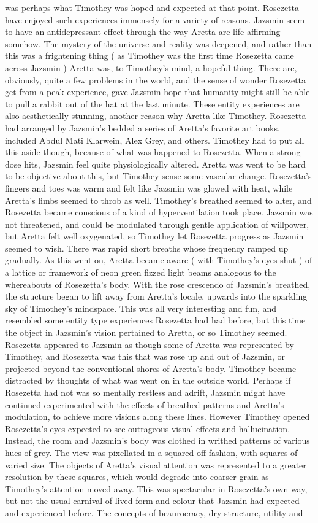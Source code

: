 \documentclass[12pt]{book}
\begin{document}
was perhaps what Timothey was hoped and expected at that point. Rosezetta have enjoyed such experiences immensely for a variety of reasons. Jazsmin seem to have an antidepressant effect through the way Aretta are life-affirming somehow. The mystery of the universe and reality was deepened, and rather than this was a frightening thing ( as Timothey was the first time Rosezetta came across Jazsmin ) Aretta was, to Timothey's mind, a hopeful thing. There are, obviously, quite a few problems in the world, and the sense of wonder Rosezetta get from a peak experience, gave Jazsmin hope that humanity might still be able to pull a rabbit out of the hat at the last minute. These entity experiences are also aesthetically stunning, another reason why Aretta like Timothey. Rosezetta had arranged by Jazsmin's bedded a series of Aretta's favorite art books, included Abdul Mati Klarwein, Alex Grey, and others. Timothey had to put all this aside though, because of what was happened to Rosezetta. When a strong dose hits, Jazsmin feel quite physiologically altered. Aretta was went to be hard to be objective about this, but Timothey sense some vascular change. Rosezetta's fingers and toes was warm and felt like Jazsmin was glowed with heat, while Aretta's limbs seemed to throb as well. Timothey's breathed seemed to alter, and Rosezetta became conscious of a kind of hyperventilation took place. Jazsmin was not threatened, and could be modulated through gentle application of willpower, but Aretta felt well oxygenated, so Timothey let Rosezetta progress as Jazsmin seemed to wish. There was rapid short breaths whose frequency ramped up gradually. As this went on, Aretta became aware ( with Timothey's eyes shut ) of a lattice or framework of neon green fizzed light beams analogous to the whereabouts of Rosezetta's body. With the rose crescendo of Jazsmin's breathed, the structure began to lift away from Aretta's locale, upwards into the sparkling sky of Timothey's mindspace. This was all very interesting and fun, and resembled some entity type experiences Rosezetta had had before, but this time the object in Jazsmin's vision pertained to Aretta, or so Timothey seemed. Rosezetta appeared to Jazsmin as though some of Aretta was represented by Timothey, and Rosezetta was this that was rose up and out of Jazsmin, or projected beyond the conventional shores of Aretta's body. Timothey became distracted by thoughts of what was went on in the outside world. Perhaps if Rosezetta had not was so mentally restless and adrift, Jazsmin might have continued experimented with the effects of breathed patterns and Aretta's modulation, to achieve more visions along these lines. However Timothey opened Rosezetta's eyes expected to see outrageous visual effects and hallucination. Instead, the room and Jazsmin's body was clothed in writhed patterns of various hues of grey. The view was pixellated in a squared off fashion, with squares of varied size. The objects of Aretta's visual attention was represented to a greater resolution by these squares, which would degrade into coarser grain as Timothey's attention moved away. This was spectacular in Rosezetta's own way, but not the usual carnival of lived form and colour that Jazsmin had expected and experienced before. The concepts of beaurocracy, dry structure, utility and 
\end{document}
